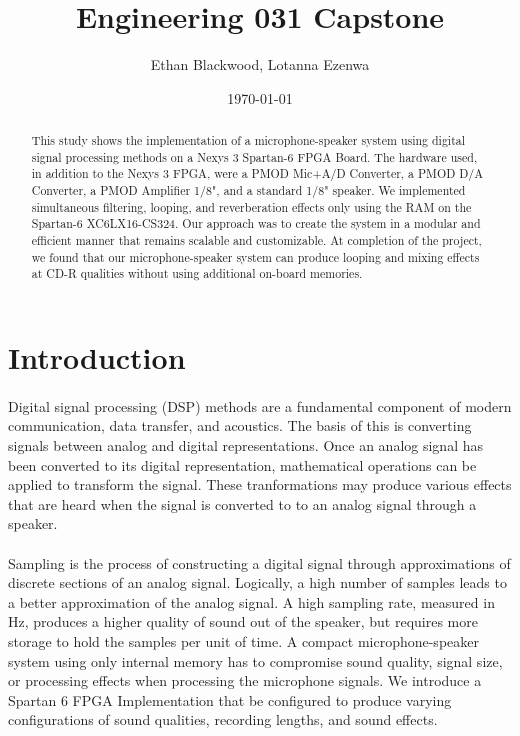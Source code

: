 \documentclass[12pt]{article}
\title{Engineering 031 Capstone}
\author{Ethan Blackwood, Lotanna Ezenwa}
\date{\today{}}
\begin{document}
\maketitle
\begin{abstract}
This study shows the implementation of a microphone-speaker system using digital signal processing methods on a Nexys 3 Spartan-6 FPGA Board. The hardware used, in addition to the Nexys 3 FPGA, were a PMOD Mic+A/D Converter, a PMOD D/A Converter, a PMOD Amplifier 1/8", and a standard 1/8" speaker. We implemented simultaneous filtering, looping, and reverberation effects only using the RAM on the Spartan-6 XC6LX16-CS324. Our approach was to create the system in a modular and efficient manner that remains scalable and customizable. At completion of the project, we found that our microphone-speaker system can produce looping and mixing effects at CD-R qualities without using additional on-board memories.

\end{abstract}
\newpage
\tableofcontents
\newpage
\section{Introduction}
\paragraph{}
Digital signal processing (DSP) methods are a fundamental component of modern communication, data transfer, and acoustics. The basis of this is converting signals between analog and digital representations. Once an analog signal has been converted to its digital representation, mathematical operations can be applied to transform the signal. These tranformations may produce various effects that are heard when the signal is converted to to an analog signal through a speaker.
\paragraph{}
Sampling is the process of constructing a digital signal through approximations of discrete sections of an analog signal. Logically, a high number of samples leads to a better approximation of the analog signal. A high sampling rate, measured in Hz, produces a higher quality of sound out of the speaker, but requires more storage to hold the samples per unit of time. A compact microphone-speaker system using only internal memory has to compromise sound quality, signal size, or processing effects when processing the microphone signals. We introduce a Spartan 6 FPGA Implementation that be configured to produce varying configurations of sound qualities, recording lengths, and sound effects.
\end{document}
